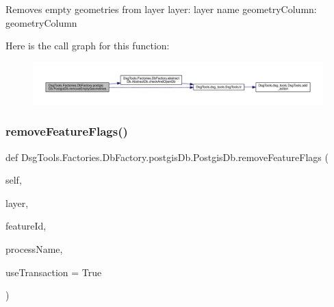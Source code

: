 \begin{DoxyVerb}Removes empty geometries from layer
layer: layer name
geometryColumn: geometryColumn
\end{DoxyVerb}
 Here is the call graph for this function\+:
\nopagebreak
\begin{figure}[H]
\begin{center}
\leavevmode
\includegraphics[width=350pt]{class_dsg_tools_1_1_factories_1_1_db_factory_1_1postgis_db_1_1_postgis_db_aaca6eee19521634d0f73a2e9281ef149_cgraph}
\end{center}
\end{figure}
\mbox{\label{class_dsg_tools_1_1_factories_1_1_db_factory_1_1postgis_db_1_1_postgis_db_ad204ec1c3548517d893e6b3f5af9594f}} 
\subsubsection{\texorpdfstring{remove\+Feature\+Flags()}{removeFeatureFlags()}}
{\footnotesize\ttfamily def Dsg\+Tools.\+Factories.\+Db\+Factory.\+postgis\+Db.\+Postgis\+Db.\+remove\+Feature\+Flags (\begin{DoxyParamCaption}\item[{}]{self,  }\item[{}]{layer,  }\item[{}]{feature\+Id,  }\item[{}]{process\+Name,  }\item[{}]{use\+Transaction = {\ttfamily True} }\end{DoxyParamCaption})}

